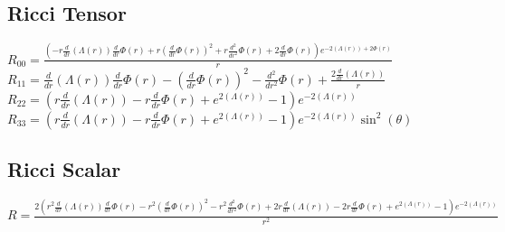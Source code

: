 \documentclass{article}
\begin{document}
\subsection*{Ricci Tensor}
$R_{00} = \frac{\left(- r \frac{d}{d r} \left(\Lambda{\left(r \right)}\right) \frac{d}{d r} \Phi{\left(r \right)} + r \left(\frac{d}{d r} \Phi{\left(r \right)}\right)^{2} + r \frac{d^{2}}{d r^{2}} \Phi{\left(r \right)} + 2 \frac{d}{d r} \Phi{\left(r \right)}\right) e^{- 2 \left(\Lambda{\left(r \right)}\right) + 2 \Phi{\left(r \right)}}}{r}$\\
$R_{11} = \frac{d}{d r} \left(\Lambda{\left(r \right)}\right) \frac{d}{d r} \Phi{\left(r \right)} - \left(\frac{d}{d r} \Phi{\left(r \right)}\right)^{2} - \frac{d^{2}}{d r^{2}} \Phi{\left(r \right)} + \frac{2 \frac{d}{d r} \left(\Lambda{\left(r \right)}\right)}{r}$\\
$R_{22} = \left(r \frac{d}{d r} \left(\Lambda{\left(r \right)}\right) - r \frac{d}{d r} \Phi{\left(r \right)} + e^{2 \left(\Lambda{\left(r \right)}\right)} - 1\right) e^{- 2 \left(\Lambda{\left(r \right)}\right)}$\\
$R_{33} = \left(r \frac{d}{d r} \left(\Lambda{\left(r \right)}\right) - r \frac{d}{d r} \Phi{\left(r \right)} + e^{2 \left(\Lambda{\left(r \right)}\right)} - 1\right) e^{- 2 \left(\Lambda{\left(r \right)}\right)} \sin^{2}{\left(\theta \right)}$\\
\subsection*{Ricci Scalar}
$R=\frac{2 \left(r^{2} \frac{d}{d r} \left(\Lambda{\left(r \right)}\right) \frac{d}{d r} \Phi{\left(r \right)} - r^{2} \left(\frac{d}{d r} \Phi{\left(r \right)}\right)^{2} - r^{2} \frac{d^{2}}{d r^{2}} \Phi{\left(r \right)} + 2 r \frac{d}{d r} \left(\Lambda{\left(r \right)}\right) - 2 r \frac{d}{d r} \Phi{\left(r \right)} + e^{2 \left(\Lambda{\left(r \right)}\right)} - 1\right) e^{- 2 \left(\Lambda{\left(r \right)}\right)}}{r^{2}}$\\
\end{document}
